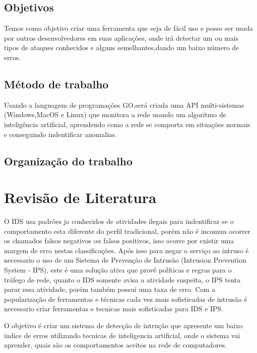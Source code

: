 \documentclass[
	12pt,				%
	openright,			%
	oneside,
	a4paper,			%
	english,			%
	french,				%
	spanish,			%
	brazil				%
	]{abntex2}
\begin{document}
\section{Objetivos}
Temos como objetivo criar uma ferramenta que seja de fácil uso e posso ser usada por outros desenvolvedores em suas aplicações, onde irá detectar um ou mais tipos de ataques conhecidos e alguns semelhantes,dando um baixo número de erros.

\section{Método de trabalho}
Usando a languagem de programações GO,será criada uma API multi-sistemas (Windows,MacOS e Linux) que monitora a rede usando um algoritmo de inteligência artificial, aprendendo como a rede se comporta em situações normais e conseguindo indentificar anomalias.
\section{Organização do trabalho}

\chapter[Revisão de Literatura]{Revisão de Literatura}
O IDS usa padrões ja conhecidos de atividades ilegais para indentificar se o comportamento esta diferente do perfil tradicional, porém não é incomun ocorrer os chamados falsos negativos ou falsos positivos, isso ocorre por existir uma margem de erro nestas classificações. 
Após isso para negar o serviço ao intruso é necessario o uso de um Sistema de Prevenção de Intrusão (Intrusion Prevention System - IPS), este é uma solução ativa que provê políticas e regras para o tráfego de rede, quanto o IDS somente avisa a atividade suspeita, o IPS tenta parar essa atividade, porém também possui uma taxa de erro.
Com a popularização de ferramentas e técnicas cada vez mais sofisticadas de intrusão é necessario criar ferramentas e tecnicas mais sofisticadas para IDS e IPS.

O objetivo é criar um sistema de detecção de intrução que apresente um baixo indice de erros utilizando tecnicas de inteligencia artificial, onde o sistema vai aprender, quais são os comportamentos aceitos na rede de computadores.
\end{document}
